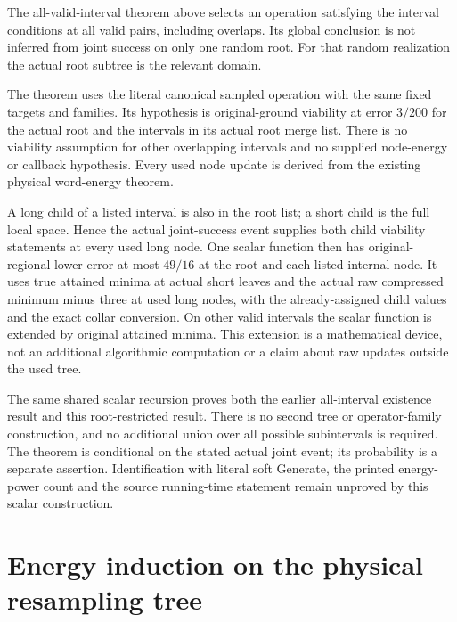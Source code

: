 \documentclass{article}
\begin{document}
The all-valid-interval theorem above selects an operation satisfying the
interval conditions at all valid pairs, including overlaps. Its global
conclusion is not inferred from joint success on only one random root.
For that random realization the actual root subtree is the relevant domain.

The theorem
uses the literal canonical sampled operation with the same fixed targets
and families. Its hypothesis is original-ground viability at error $3/200$
for the actual root and the intervals in its actual root merge list.
There is no viability assumption for other overlapping intervals and no
supplied node-energy or callback hypothesis. Every used node update is
derived from the existing physical word-energy theorem.

A long child of a listed interval is also in the root list; a short child
is the full local space. Hence the actual joint-success event supplies
both child viability statements at every used long node. One scalar
function then has original-regional lower error at most $49/16$ at the
root and each listed internal node. It uses true attained minima at actual
short leaves and the actual raw compressed minimum minus three at used
long nodes, with the already-assigned child values and the exact collar
conversion. On other valid intervals the scalar function is extended by original
attained minima. This extension is a mathematical device, not an additional
algorithmic computation or a claim about raw updates outside the used tree.

The same shared scalar recursion proves both the earlier all-interval
existence result and this root-restricted result. There is no second tree
or operator-family construction, and no additional union over all possible
subintervals is required. The theorem is conditional on the stated actual
joint event; its probability is a separate assertion. Identification with
literal soft Generate, the printed energy-power count and the source
running-time statement remain unproved by this scalar construction.

\section{Energy induction on the physical resampling tree}
\end{document}
